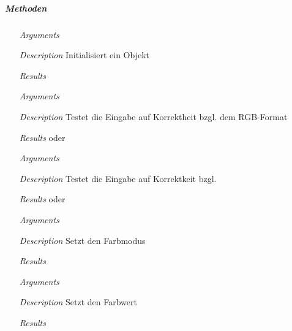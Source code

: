 \subparagraph{Methoden}
\begin{description}
\item {}
\begin{enumerate}
\item[\textit{Arguments}] 
\item[\textit{Description}] Initialisiert ein Objekt
\item[\textit{Results}] 
\end{enumerate}

\item {}
\begin{enumerate}
\item[\textit{Arguments}] 
\item[\textit{Description}] Testet die Eingabe auf Korrektheit bzgl.
dem RGB-Format
\item[\textit{Results}]  oder 
\end{enumerate}

\item {}
\begin{enumerate}
\item[\textit{Arguments}] 
\item[\textit{Description}] Testet die Eingabe auf Korrektkeit bzgl.
\item[\textit{Results}]  oder 
\end{enumerate}

\item {}
\begin{enumerate}
\item[\textit{Arguments}] 
\item[\textit{Description}] Setzt den Farbmodus
\item[\textit{Results}] 
\end{enumerate}

\item {}
\begin{enumerate}
\item[\textit{Arguments}]  
\item[\textit{Description}] Setzt den Farbwert
\item[\textit{Results}] 
\end{enumerate}


\end{description}
